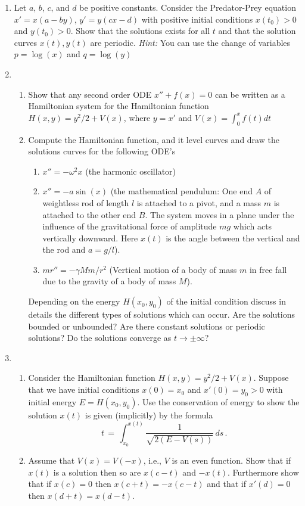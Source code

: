 \documentclass[12pt]{report}
\def\to{\rightarrow}
\begin{document}
\begin{enumerate}
\item Let $a$, $b$, $c$, and $d$ be positive constants. 
Consider the Predator-Prey equation $x' = x(a - b y)$,   $y' = y(cx - d)$ with positive 
initial conditions $x(t_0)>0$ and $y(t_0)>0$.  Show that the solutions  exists for all 
$t$ and that the solution curves $x(t), y(t)$ are periodic.  
{\em Hint:} You can use the change of variables $p = \log(x)$ and $q=\log(y)$ 

\item 
\begin{enumerate}  
\item Show that any second order ODE $x''+f(x)=0$ can be written as a Hamiltonian system for the  Hamiltonian function $H(x,y)=y^2/2 + V(x)$, where $y=x'$ and $V(x)=\int_0^x f(t)dt$  
\item Compute the Hamiltonian function, and it level curves and draw the solutions curves 
for the following ODE's
\begin{enumerate}
\item $x'' =- \omega^2 x $ (the harmonic oscillator) 
\item $x'' =- a \sin(x)$ (the mathematical pendulum: One end $A$ of weightless rod of length $l$ is attached to a pivot, and a mass $m$ is attached to the other end $B$. The system moves in a plane under the influence of the gravitational force of amplitude $mg$ which acts vertically downward.  
Here $x(t)$ is the angle between the vertical and the rod and $a=g/l$).   
\item $mr''= - \gamma Mm/r^2$ (Vertical motion of a body of mass $m$  in free fall due to the gravity of  a body of mass $M$). 
\end{enumerate} 
Depending on the energy $H(x_0, y_0)$ of the initial condition discuss in details 
the different types of  solutions which can occur. Are the solutions bounded or unbounded? Are there constant solutions or periodic solutions? Do the solutions converge as $t \to \pm \infty$? 
\end{enumerate}

\item  
\begin{enumerate}
\item Consider the Hamiltonian function $H(x,y)= y^2/2 + V(x)$.  Suppose that we have initial conditions $x(0)=x_0$ and $x'(0)=y_0 > 0$ with initial energy $E= H(x_0,y_0)$.   
Use the conservation of energy to show the solution $x(t)$ is given (implicitly) 
by the formula 
$$
t\,=\, \int_{x_0}^{x(t)}  \frac{1}{ \sqrt{2 (E - V(s))}}\, ds \,.
$$
\item Assume that $V(x)=V(-x)$, i.e., $V$ is an even function.  Show that if $x(t)$ is a solution 
then so are $x(c-t)$ and $-x(t)$.  Furthermore show that if $x(c)=0$ then $x(c+t)= -x(c-t)$ and that
if $x'(d)=0$ then $x(d+t)=x(d-t)$.   



\end{enumerate}
\end{enumerate}
\end{document}
